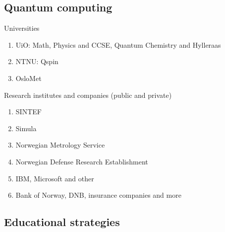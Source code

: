 \documentclass[%
oneside,                 %
final,                   %
10pt]{article}
\begin{document}
\subsection{Quantum computing}

\begin{block}{Universities }
\begin{enumerate}
\item UiO: Math, Physics and CCSE, Quantum Chemistry and Hylleraas

\item NTNU: Qspin

\item OsloMet
\end{enumerate}

\noindent
\end{block}

\begin{block}{Research institutes and companies (public and private) }
\begin{enumerate}
\item SINTEF

\item Simula

\item Norwegian Metrology Service

\item Norwegian Defense Research Establishment

\item IBM, Microsoft and other

\item Bank of Norway, DNB, insurance companies and more
\end{enumerate}

\noindent
\end{block}

\subsection{Educational strategies}
\end{document}
